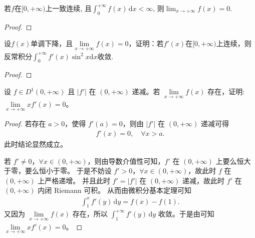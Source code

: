 \documentclass[../../main.tex]{subfiles}
\begin{document}
\begin{proposition}
若$f$在$[0, +\infty)$上一致连续, 且$\int_0^{+\infty} f(x) \, \mathrm{d}x < \infty$, 则$\lim_{x \to +\infty} f(x) = 0$.
\end{proposition}
\begin{proof}

\end{proof}

\begin{example}
设\(f(x)\)单调下降，且\(\lim\limits_{x \to +\infty} f(x)=0\)，证明：若\(f'(x)\)在\([0, +\infty)\)上连续，则反常积分\(\int_{0}^{+\infty} f'(x)\sin^{2} x\mathrm{d}x\)收敛.
\end{example}
\begin{proof}

\end{proof}

\begin{example}
设 \(f\in D^{1}(0,+\infty)\) 且 \(|f'|\) 在 \((0,+\infty)\) 递减。若 \(\lim\limits_{x \to +\infty} f(x)\) 存在，证明: \(\lim\limits_{x \to +\infty} x f'(x)=0\)。 
\end{example}
\begin{proof}
若存在 \(a > 0\)，使得 \(f'(a) = 0\)，则由 \(|f'|\) 在 \((0, +\infty)\) 递减可得
\begin{align*}
f'(x) = 0, \quad \forall x > a.
\end{align*}
此时结论显然成立。

若 \(f' \neq 0\)，\(\forall x \in (0, +\infty)\)，则由导数介值性可知，\(f'\) 在 \((0, +\infty)\) 上要么恒大于零，要么恒小于零。
于是不妨设 \(f' > 0\)，\(\forall x \in (0, +\infty)\)，故此时 \(f\) 在 \((0, +\infty)\) 上严格递增。
并且此时 \(f' = |f'|\) 在 \((0, +\infty)\) 递减，故此时 \(f'\) 在 \((0, +\infty)\) 内闭 Riemann 可积。
从而由微积分基本定理可知
\begin{align*}
\int_1^x f'(y) \, \mathrm{d}y = f(x) - f(1).
\end{align*}
又因为 \(\lim\limits_{x \to +\infty} f(x)\) 存在，所以 \(\int_1^{+\infty} f'(y) \, \mathrm{d}y\) 收敛。于是由可知 \(\lim\limits_{x \to +\infty} x f'(x) = 0\)。
\end{proof}
\end{document}

